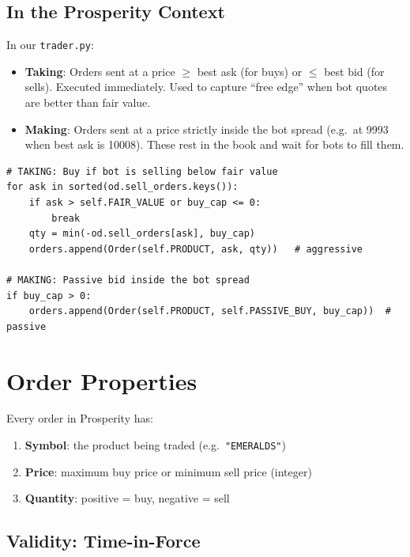 \documentclass[12pt,a4paper,openany]{report}
\theoremstyle{definition}
\begin{document}
\subsection{In the Prosperity Context}

In our \texttt{trader.py}:
\begin{itemize}
  \item \textbf{Taking}: Orders sent at a price $\geq$ best ask (for buys) or $\leq$ best bid (for sells). Executed immediately. Used to capture ``free edge'' when bot quotes are better than fair value.
  \item \textbf{Making}: Orders sent at a price strictly inside the bot spread (e.g.\ at 9993 when best ask is 10008). These rest in the book and wait for bots to fill them.
\end{itemize}

\begin{lstlisting}[caption={Taking vs.\ making in EmeraldsStrategy.orders()}]
# TAKING: Buy if bot is selling below fair value
for ask in sorted(od.sell_orders.keys()):
    if ask > self.FAIR_VALUE or buy_cap <= 0:
        break
    qty = min(-od.sell_orders[ask], buy_cap)
    orders.append(Order(self.PRODUCT, ask, qty))   # aggressive

# MAKING: Passive bid inside the bot spread
if buy_cap > 0:
    orders.append(Order(self.PRODUCT, self.PASSIVE_BUY, buy_cap))  # passive
\end{lstlisting}

\section{Order Properties}

Every order in Prosperity has:
\begin{enumerate}
  \item \textbf{Symbol}: the product being traded (e.g.\ \texttt{"EMERALDS"})
  \item \textbf{Price}: maximum buy price or minimum sell price (integer)
  \item \textbf{Quantity}: positive = buy, negative = sell
\end{enumerate}

\subsection{Validity: Time-in-Force}
\end{document}
